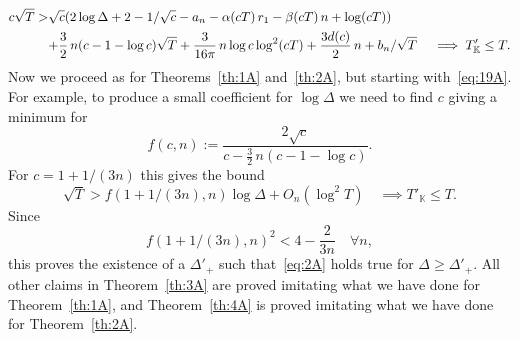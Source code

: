 \documentclass[a4paper,11pt]{amsart}
\newcommand{\field}[1]{\mathbb{{#1}}}
\newcommand{\K}{\field{{K}}}
\newcommand{\rc}[1]{{\color{red}{#1}}}
\theoremstyle{remark}
\begin{document}
%
\begin{align}
c \sqrt{T}
>&  \sqrt{c}(2\log \Delta + 2 - 1/\sqrt{c} - a_n - \alpha(cT)\,r_1 - \beta(cT)\,n + \log(cT))  \notag     \\
&  {+} \frac{3}{2}\,n (c-1-\log c)\sqrt{T} + \frac{3}{16\pi}\,n\log c\log^2(cT) + \frac{3d(c)}{2}\,n + b_n/\sqrt{T}
\quad
\implies T'_\K \leq T.                                                                         \label{eq:19A}
\end{align}
%
Now we proceed as for Theorems~\ref{th:1A} and~\ref{th:2A}, but starting with~\eqref{eq:19A}. For
example, to produce a small coefficient for $\log\Delta$ we need to find $c$ giving a minimum for
\[
f(c,n):=\frac{2\sqrt{c}}{c - \frac{3}{2}\,n (c-1-\log c)}.
\]
For $c = 1+1/(3n)$ this gives the bound
\[
\sqrt{T}
>  f(1+1/(3n),n) \log \Delta
   + O_{n}(\log^2 T)
\quad
\implies T'_\K \leq T.
\]
%
Since
\[
f(1+1/(3n),n)^2 < 4-\frac{2}{3n}
\quad\forall n,
\]
%
this proves the existence of a $\Delta'_{+}$ such that~\eqref{eq:2A} holds true for $\Delta \geq
\Delta'_{+}$. All other claims in Theorem~\ref{th:3A} are proved imitating what we have done for
Theorem~\ref{th:1A}, and Theorem~\ref{th:4A} is proved imitating what we have done for
Theorem~\ref{th:2A}.
%
\end{document}
